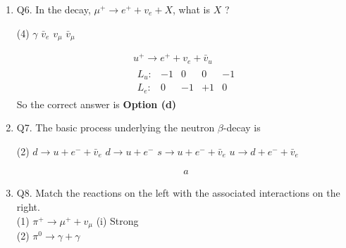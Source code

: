 \begin{enumerate}
	{}
	 \begin{tasks}(2)
		\task[\textbf{a.}]$\alpha$-particle
		\task[\textbf{b.}]${ }_4 B e^7$ nucleus
		\task[\textbf{c.}]Hydrogen atom
		\task[\textbf{d.}]Deuteron 
	\end{tasks}
\begin{answer}
	If a nucleus contains odd number of nucleons, it is fermions. If a nucleus contains even number of nucleons, it is a boson.\\
	So the correct answer is \textbf{Option (b)}
\end{answer}
	\item Q6. In the decay, $\mu^{+} \rightarrow e^{+}+v_e+X$, what is $X$ ?
	{}
	 \begin{tasks}(4)
		\task[\textbf{a.}]$\gamma$
		\task[\textbf{b.}]$\bar{v}_e$
		\task[\textbf{c.}]$v_\mu$
		\task[\textbf{d.}]$\bar{v}_\mu$ 
	\end{tasks}
\begin{answer}
	\begin{align*}
	u^{+} \rightarrow e^{+}+v_e+\bar{v}_u\\
	\begin{array}{rrrrr}
	L_u: & -1 & 0 & 0 & -1 \\
	L_e: & 0 & -1 & +1 & 0
	\end{array}
	\end{align*}
	So the correct answer is \textbf{Option (d)}
\end{answer}
	\item Q7. The basic process underlying the neutron $\beta$-decay is
	{}
	 \begin{tasks}(2)
		\task[\textbf{a.}]$d \rightarrow u+e^{-}+\bar{v}_e$
		\task[\textbf{b.}]$d \rightarrow u+e^{-}$
		\task[\textbf{c.}]$s \rightarrow u+e^{-}+\bar{v}_e$
		\task[\textbf{d.}]$u \rightarrow d+e^{-}+\bar{v}_e$ 
	\end{tasks}
\begin{answer}
	\begin{align*}
a	
	\end{align*}
\end{answer}
	\item Q8. Match the reactions on the left with the associated interactions on the right.\\
	(1) $\pi^{+} \rightarrow \mu^{+}+v_\mu$\hspace{3cm}
	(i) Strong\\
	(2) $\pi^0 \rightarrow \gamma+\gamma$\hspace{3.5cm}

\end{enumerate}
